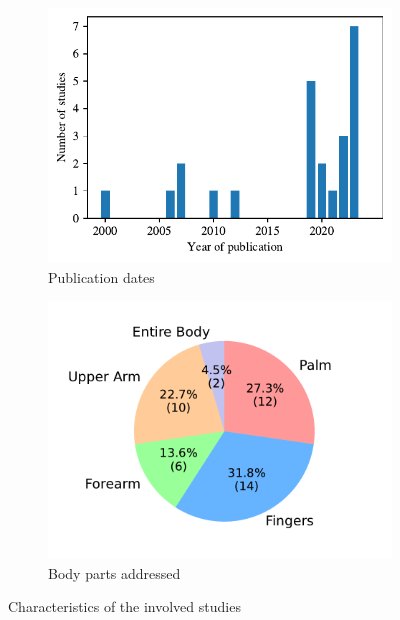 \begin{figure}[htbp]
    \centering
    \begin{subfigure}[b]{0.24\textwidth}
        \centering
        \includegraphics[width=\textwidth]{figures/years.pdf}
        \caption{Publication dates}
        \label{fig:years}
    \end{subfigure}
    \hfill
    \begin{subfigure}[b]{0.24\textwidth}
        \centering
        \includegraphics[width=\textwidth]{figures/body_pie.pdf}
        \caption{Body parts addressed}
        \label{fig:body_parts_pie}
    \end{subfigure}
    \caption{Characteristics of the involved studies}
    \label{fig:years_and_body}
\end{figure}

